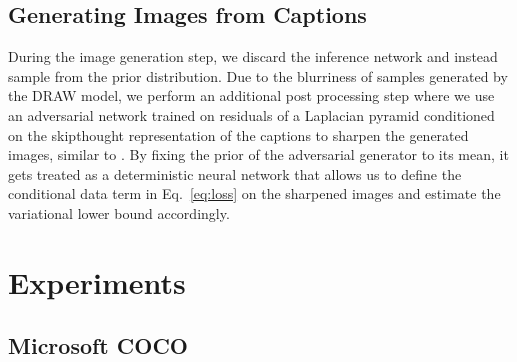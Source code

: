 \documentclass{article} %
\newcommand{\Eqref}[1]{Eq.~\ref{#1}} %
\begin{document}
\subsection{Generating Images from Captions}

During the image generation step, we discard the inference network and instead sample from the prior distribution. 
Due to the blurriness of samples generated by the DRAW model, we perform an additional post processing step where we use an 
adversarial network trained on residuals of a Laplacian pyramid conditioned on the skipthought representation \citep{kiros_skipthought} of the captions 
to sharpen the generated images, similar to \citep{denton_lapgan}. By fixing the prior of the adversarial generator to its mean, it gets treated as a deterministic neural network that allows us to define the conditional data term in \Eqref{eq:loss} on the sharpened images and 
estimate the variational lower bound accordingly. 

\section{Experiments}
\subsection{Microsoft COCO}
\end{document}

